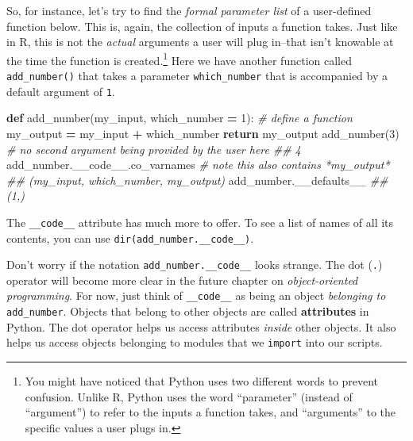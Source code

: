 \documentclass[
  12pt,
  krantz2]{krantz}
\makeatletter
\newenvironment{Shaded}{\begin{snugshade}}{\end{snugshade}}
\newcommand{\CommentTok}[1]{\textcolor[rgb]{0.37,0.37,0.37}{\textit{#1}}}
\newcommand{\ControlFlowTok}[1]{\textcolor[rgb]{0.27,0.27,0.27}{\textbf{#1}}}
\newcommand{\DecValTok}[1]{\textcolor[rgb]{0.06,0.06,0.06}{#1}}
\newcommand{\KeywordTok}[1]{\textcolor[rgb]{0.27,0.27,0.27}{\textbf{#1}}}
\newcommand{\NormalTok}[1]{#1}
\newcommand{\OperatorTok}[1]{\textcolor[rgb]{0.43,0.43,0.43}{\textbf{#1}}}
\newenvironment{kframe}{%
\medskip{}
\setlength{\fboxsep}{.8em}
 \def\at@end@of@kframe{}%
 \ifinner\ifhmode%
  \def\at@end@of@kframe{\end{minipage}}%
  \begin{minipage}{\columnwidth}%
 \fi\fi%
 \def\FrameCommand##1{\hskip\@totalleftmargin \hskip-\fboxsep
 \colorbox{shadecolor}{##1}\hskip-\fboxsep
     \hskip-\linewidth \hskip-\@totalleftmargin \hskip\columnwidth}%
 \MakeFramed {\advance\hsize-\width
   \@totalleftmargin\z@ \linewidth\hsize
   \@setminipage}}%
 {\par\unskip\endMakeFramed%
 \at@end@of@kframe}
\renewenvironment{Shaded}{\begin{kframe}}{\end{kframe}}
\makeatother
\begin{document}
So, for instance, let's try to find the \emph{formal parameter list} of a user-defined function below. This is, again, the collection of inputs a function takes. Just like in R, this is not the \emph{actual} arguments a user will plug in--that isn't knowable at the time the function is created.\footnote{You might have noticed that Python uses two different words to prevent confusion. Unlike R, Python uses the word ``parameter'' (instead of ``argument'') to refer to the inputs a function takes, and ``arguments'' to the specific values a user plugs in.} Here we have another function called \texttt{add\_number()} that takes a parameter \texttt{which\_number} that is accompanied by a default argument of \texttt{1}.

\begin{Shaded}
\begin{Highlighting}[]
\KeywordTok{def}\NormalTok{ add\_number(my\_input, which\_number }\OperatorTok{=} \DecValTok{1}\NormalTok{): }\CommentTok{\# define a function}
\NormalTok{    my\_output }\OperatorTok{=}\NormalTok{ my\_input }\OperatorTok{+}\NormalTok{ which\_number}
    \ControlFlowTok{return}\NormalTok{ my\_output}
\NormalTok{add\_number(}\DecValTok{3}\NormalTok{) }\CommentTok{\# no second argument being provided by the user here}
\CommentTok{\#\# 4}
\NormalTok{add\_number.\_\_code\_\_.co\_varnames }\CommentTok{\# note this also contains *my\_output*}
\CommentTok{\#\# (\textquotesingle{}my\_input\textquotesingle{}, \textquotesingle{}which\_number\textquotesingle{}, \textquotesingle{}my\_output\textquotesingle{})}
\NormalTok{add\_number.\_\_defaults\_\_}
\CommentTok{\#\# (1,)}
\end{Highlighting}
\end{Shaded}

The \texttt{\_\_code\_\_} attribute has much more to offer. To see a list of names of all its contents, you can use \texttt{dir(add\_number.\_\_code\_\_)}.

\begin{rmd-details}
Don't worry if the notation \texttt{add\_number.\_\_code\_\_} looks strange. The dot (\texttt{.}) operator will become more clear in the future chapter on \emph{object-oriented programming}. For now, just think of \texttt{\_\_code\_\_} as being an object \emph{belonging to} \texttt{add\_number}. Objects that belong to other objects are called \textbf{attributes} in Python. The dot operator helps us access attributes \emph{inside} other objects. It also helps us access objects belonging to modules that we \texttt{import} into our scripts.

\end{rmd-details}
\end{document}
